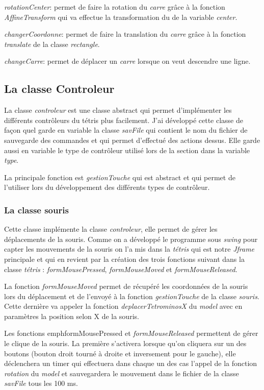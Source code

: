 \documentclass{article}           %
\begin{document}
\emph{rotationCenter}: permet de faire la rotation du \emph{carre} grâce à la fonction \emph{AffineTransform} qui va effectue la transformation du de la variable \emph{center}.

\emph{changerCoordonne}: permet de faire la translation du \emph{carre} grâce à la fonction \emph{translate} de la classe \emph{rectangle}.

\emph{changeCarre}: permet de déplacer un \emph{carre} lorsque on veut descendre une ligne.

\subsection{La classe Controleur}
La classe \emph{controleur} est une classe abstract qui permet d'implémenter les différents contrôleurs du tétris plus facilement. J'ai développé cette classe de façon quel garde en variable la classe \emph{savFile} qui contient le nom du fichier de sauvegarde des commandes et qui permet d'effectué des actions dessus. Elle garde aussi en variable le type de contrôleur utilisé lors de la section dans la variable \emph{type}.

La principale fonction est \emph{gestionTouche} qui est abstract et qui permet de l'utiliser lors du développement des différents types de contrôleur.

\subsubsection{La classe souris}
Cette classe implémente la classe \emph{controleur}, elle permet de gérer les déplacements de la souris. Comme on a développé le programme sous \emph{swing} pour capter les mouvements de la souris on l'a mis dans la \emph{tétris} qui est notre \emph{Jframe} principale et qui en revient par la création des trois fonctions suivant dans la classe \emph{tétris} : \emph{formMousePressed}, \emph{formMouseMoved} et \emph{formMouseReleased}.

La fonction \emph{formMouseMoved} permet de récupéré les coordonnées de la souris lors du déplacement et de l'envoyé à la fonction \emph{gestionTouche} de la classe \emph{souris}. Cette dernière va appeler la fonction \emph{deplacerTetrominosX} du \emph{model} avec en paramètres la position selon X de la souris.

Les fonctions emph{formMousePressed} et \emph{formMouseReleased} permettent de gérer le clique de la souris. La première s'activera lorsque qu'on cliquera sur un des boutons (bouton droit tourné à droite et inversement pour le gauche), elle déclenchera un timer qui effectuera dans chaque un des cas l'appel de la fonction \emph{rotation} du \emph{model} et sauvegardera le mouvement dans le fichier de la classe \emph{savFile} tous les 100 ms.
\end{document}
